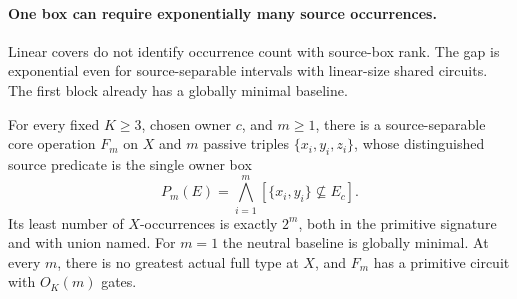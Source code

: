 \paragraph{One box can require exponentially many source occurrences.}
Linear covers do not identify occurrence count with source-box rank.
The gap is exponential even for source-separable intervals with linear-size
shared circuits. The first block already has a globally minimal baseline.

\begin{theorem}
\label{core:thm:one-box-exponential-copies}
For every fixed $K\geq3$, chosen owner $c$, and $m\geq1$, there is a source-separable core
operation $F_m$ on $X$ and $m$ passive triples $\{x_i,y_i,z_i\}$,
whose distinguished source predicate is the single owner box
\[
 P_m(E)=\bigwedge_{i=1}^m[\{x_i,y_i\}\nsubseteq E_c].
\]
Its least number of $X$-occurrences is exactly $2^m$, both in the
primitive signature and with union named. For $m=1$ the neutral baseline
is globally minimal. At every $m$, there is no greatest actual full type
at $X$, and $F_m$ has a primitive circuit with $O_K(m)$ gates.
\end{theorem}
